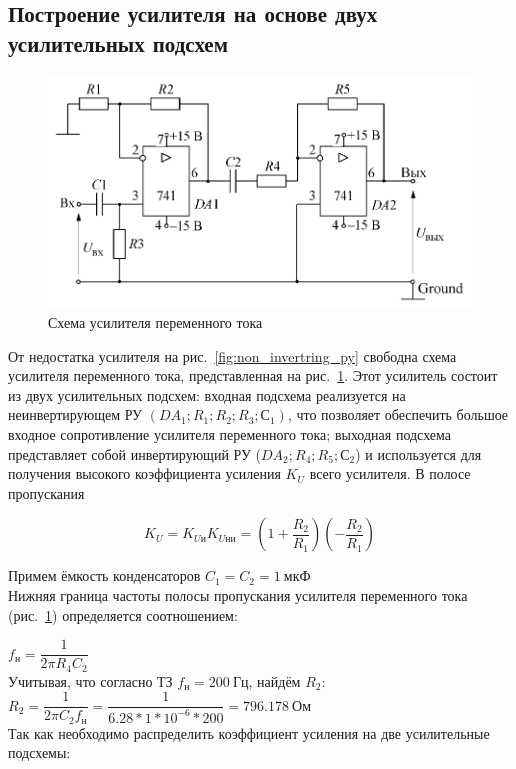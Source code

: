 \subsection{Построение усилителя на основе двух усилительных подсхем}

\begin{figure}[H]
	\centering
	\includegraphics[width=0.7\linewidth]{photo/sub2_py}
	\caption{Схема усилителя переменного тока}
	\label{fig:sub2_py}
\end{figure}

От недостатка усилителя на рис.~\ref{fig:non_invertring_py} 
свободна схема усилителя переменного тока, 
представленная на рис.~\ref{fig:sub2_py}. 
Этот усилитель состоит из двух усилительных подсхем: 
входная подсхема реализуется на неинвертирующем РУ $ (DA_1; R_1; R_2; R_3; С_1) $, 
что позволяет обеспечить большое входное сопротивление усилителя переменного тока; 
выходная подсхема представляет собой инвертирующий РУ ($ DA_2; R_4; R_5; С_2 $) 
и используется для получения высокого коэффициента усиления $ K_U $ всего усилителя. 
В полосе пропускания

$$ 
K_U = 
K_{Uи} K_{Uни} = 
\left( 1 + \dfrac{R_2}{R_1} \right)
\left( -\dfrac{R_2}{R_1} \right) 
$$

Примем ёмкость конденсаторов $ C_1 = C_2 = 1~мкФ $\\

Нижняя граница частоты полосы пропускания 
усилителя переменного тока (рис.~\ref{fig:sub2_py}) 
определяется соотношением:

$ f_н = \dfrac{1}{2 \pi R_4 C_2} $\\

Учитывая, что согласно ТЗ $ f_н = 200~Гц $, найдём $ R_2 $:\\

$ R_2 = \dfrac{1}{2 \pi C_2 f_н} = \dfrac{1}{6.28 * 1 * 10^{-6} * 200} = 796.178~Ом $\\

Так как необходимо распределить коэффициент усиления на две усилительные подсхемы: 


